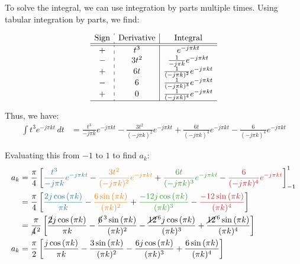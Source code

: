 \documentclass[a4paper, 10pt]{article}
\begin{document}
\begin{solution}
To solve the integral, we can use integration by parts multiple times.
Using tabular integration by parts, we find:

\renewcommand{\arraystretch}{1.7}
\[
\begin{array}{c:c|c}
    \text{Sign} & \text{Derivative} & \text{Integral} \\
    \hline
    \hline
    + & t^3 & e^{-j \pi k t} \\
    - & 3t^2 & \frac{1}{-j \pi k} e^{-j \pi k t} \\
    + & 6t & \frac{1}{(-j \pi k)^2} e^{-j \pi k t} \\
    - & 6 & \frac{1}{(-j \pi k)^3} e^{-j \pi k t} \\
    + & 0 & \frac{1}{(-j \pi k)^4} e^{-j \pi k t} \\
    \hline
\end{array}
\]

Thus, we have:
\begin{align*}
    \int t^3 e^{-j \pi k t} \,dt &= \frac{t^3}{-j \pi k} e^{-j \pi k t} - \frac{3t^2}{(-j \pi k)^2} e^{-j \pi k t} + \frac{6t}{(-j \pi k)^3} e^{-j \pi k t} - \frac{6}{(-j \pi k)^4} e^{-j \pi k t}
\end{align*}

Evaluating this from \( -1 \) to \( 1 \) to find \( a_k \):
\begin{align*}
    a_k &= \frac{\pi}{4} \sqbracket{ \textcolor[HTML]{1F77B4}{ \frac{t^3}{-j \pi k} e^{-j \pi k t} } - \textcolor[HTML]{FF7F0E}{ \frac{3t^2}{(-j \pi k)^2} e^{-j \pi k t} } + \textcolor[HTML]{2CA02C}{ \frac{6t}{(-j \pi k)^3} e^{-j \pi k t} } - \textcolor[HTML]{D62728}{ \frac{6}{(-j \pi k)^4} e^{-j \pi k t} } }_{-1}^{1} \\
    &= \frac{\pi}{4} \sqbracket{ \textcolor[HTML]{1F77B4}{ \frac{2j\cos{(\pi k)}}{\pi k} } - \textcolor[HTML]{FF7F0E}{ \frac{6 \sin{(\pi k)} }{(\pi k)^2} } + \textcolor[HTML]{2CA02C}{ \frac{-12j \cos{(\pi k)}}{(\pi k)^3} } - \textcolor[HTML]{D62728}{ \frac{-12\sin{(\pi k)}}{(\pi k)^4} } } \\
    &= \frac{\pi}{\cancel{4}^{\, 2}} \sqbracket{ \frac{\cancel{2}j\cos{(\pi k)}}{\pi k} - \frac{\cancel{6}^{\, 3} \sin{(\pi k)} }{(\pi k)^2} - \frac{\cancel{12}^{\, 6}j \cos{(\pi k)}}{(\pi k)^3} + \frac{\cancel{12}^{\, 6} \sin{(\pi k)}}{(\pi k)^4} } \\
    a_k &= \frac{\pi}{2} \sqbracket{ \frac{j \cos{(\pi k)}}{\pi k} - \frac{3 \sin{(\pi k)} }{(\pi k)^2} - \frac{6 j \cos{(\pi k)}}{(\pi k)^3} + \frac{6 \sin{(\pi k)}}{(\pi k)^4} }
\end{align*}


\end{solution}
\end{document}
